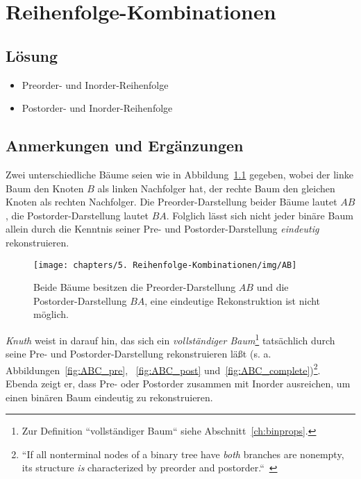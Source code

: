 \chapter{Reihenfolge-Kombinationen}

\section*{Lösung}

\begin{itemize}
    \item Preorder- und Inorder-Reihenfolge
    \item Postorder- und Inorder-Reihenfolge
\end{itemize}


\section*{Anmerkungen und Ergänzungen}

Zwei unterschiedliche Bäume seien wie in Abbildung~\ref{fig:AB} gegeben, wobei der linke Baum den Knoten $B$ als linken
Nachfolger hat, der rechte Baum den gleichen Knoten als rechten Nachfolger.
Die Preorder-Darstellung beider Bäume lautet $AB$, die Postorder-Darstellung lautet $BA$.
Folglich lässt sich nicht jeder binäre Baum allein durch die Kenntnis seiner Pre- und Postorder-Darstellung \textit{eindeutig} rekonstruieren.

\begin{figure}[h]
    \centering
    \texttt{[image: chapters/5. Reihenfolge-Kombinationen/img/AB]}
    \caption{Beide Bäume besitzen die Preorder-Darstellung $AB$ und die Postorder-Darstellung $BA$, eine eindeutige Rekonstruktion ist nicht möglich.}
    \label{fig:AB}
\end{figure}

\textit{Knuth} weist in \cite[564]{Knu97} darauf hin, das sich ein \textit{vollständiger Baum}\footnote{
    Zur Definition ``vollständiger Baum`` siehe Abschnitt~\ref{ch:binprops}.
} tatsächlich durch seine Pre- und Postorder-Darstellung rekonstruieren läßt ({s. a.} Abbildungen~\ref{fig:ABC_pre}, ~\ref{fig:ABC_post} und~\ref{fig:ABC_complete})\footnote{
    ``If all nonterminal nodes of a binary tree have \textit{both} branches are nonempty, its structure \textit{is} characterized by preorder and postorder.``~\cite[564, 7., Hervorhebungen i.O.]{Knu97}
}.
Ebenda zeigt er, dass Pre- oder Postorder zusammen mit Inorder ausreichen, um einen binären Baum eindeutig zu rekonstruieren.


